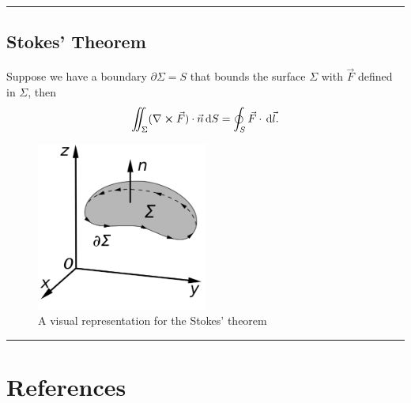 \documentclass[a4paper]{article}
\newcommand{\dmr}[1]{\, \mathrm{d}#1} %
\numberwithin{equation}{subsection}
\begin{document}
\par\noindent\rule{\textwidth}{0.4pt}

\subsection{Stokes' Theorem}
Suppose we have a boundary $\partial \Sigma = S$ that bounds the surface $\Sigma$ with $\vec{F}$ defined in $\Sigma$, then
\[
    \iint_{\Sigma} (\nabla \cross \vec{F})\cdot\vec{n}\dmr{S} = \oint_{S} \vec{F}\cdot \dmr{\vec{l}}.
\] 
\begin{figure}[h]
    \centering
    \includegraphics[width =0.5\textwidth]{1200px-Stokes'_Theorem.svg.png}
    \caption{A visual representation for the Stokes' theorem\cite{noauthor_stokes_2021}}
\end{figure}

\par\noindent\rule{\textwidth}{0.4pt}



















\newpage
\section*{References}
%
\printbibliography[heading = none]
\end{document}
